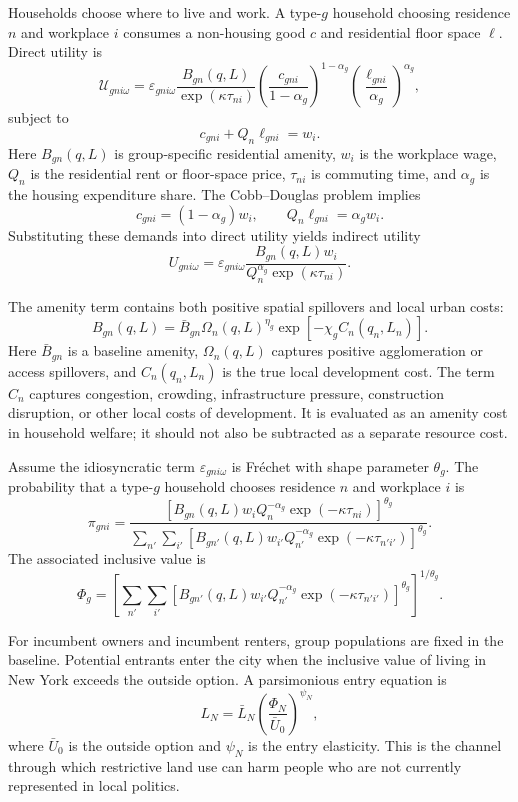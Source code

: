 Households choose where to live and work.
A type-\(g\) household choosing residence \(n\) and workplace \(i\) consumes a non-housing good \(c\) and residential floor space \(\ell\).
Direct utility is
\[
    \mathcal{U}_{gni\omega}
    =
    \varepsilon_{gni\omega}
    \frac{B_{gn}(q,L)}{\exp(\kappa \tau_{ni})}
    \left(\frac{c_{gni}}{1-\alpha_g}\right)^{1-\alpha_g}
    \left(\frac{\ell_{gni}}{\alpha_g}\right)^{\alpha_g},
\]
subject to
\[
    c_{gni}+Q_n\ell_{gni}=w_i.
\]
Here \(B_{gn}(q,L)\) is group-specific residential amenity, \(w_i\) is the workplace wage, \(Q_n\) is the residential rent or floor-space price, \(\tau_{ni}\) is commuting time, and \(\alpha_g\) is the housing expenditure share.
The Cobb--Douglas problem implies
\[
    c_{gni}=(1-\alpha_g)w_i,
    \qquad
    Q_n\ell_{gni}=\alpha_g w_i.
\]
Substituting these demands into direct utility yields indirect utility
\[
    U_{gni\omega}
    =
    \varepsilon_{gni\omega}
    \frac{B_{gn}(q,L)w_i}{Q_n^{\alpha_g}\exp(\kappa\tau_{ni})}.
\]

The amenity term contains both positive spatial spillovers and local urban costs:
\[
    B_{gn}(q,L)
    =
    \bar B_{gn}\Omega_n(q,L)^{\eta_g}
    \exp[-\chi_g C_n(q_n,L_n)].
\]
Here \(\bar B_{gn}\) is a baseline amenity, \(\Omega_n(q,L)\) captures positive agglomeration or access spillovers, and \(C_n(q_n,L_n)\) is the true local development cost.
The term \(C_n\) captures congestion, crowding, infrastructure pressure, construction disruption, or other local costs of development.
It is evaluated as an amenity cost in household welfare; it should not also be subtracted as a separate resource cost.

Assume the idiosyncratic term \(\varepsilon_{gni\omega}\) is Fr\'echet with shape parameter \(\theta_g\).
The probability that a type-\(g\) household chooses residence \(n\) and workplace \(i\) is
\[
    \pi_{gni}
    =
    \frac{
    \left[
    B_{gn}(q,L)w_i Q_n^{-\alpha_g}\exp(-\kappa\tau_{ni})
    \right]^{\theta_g}
    }{
    \sum_{n'}\sum_{i'}
    \left[
    B_{gn'}(q,L)w_{i'}Q_{n'}^{-\alpha_g}\exp(-\kappa\tau_{n'i'})
    \right]^{\theta_g}
    }.
\]
The associated inclusive value is
\[
    \Phi_g
    =
    \left[
    \sum_{n'}\sum_{i'}
    \left[
    B_{gn'}(q,L)w_{i'}Q_{n'}^{-\alpha_g}\exp(-\kappa\tau_{n'i'})
    \right]^{\theta_g}
    \right]^{1/\theta_g}.
\]

For incumbent owners and incumbent renters, group populations are fixed in the baseline.
Potential entrants enter the city when the inclusive value of living in New York exceeds the outside option.
A parsimonious entry equation is
\[
    L_N
    =
    \bar L_N
    \left(\frac{\Phi_N}{\bar U_0}\right)^{\psi_N},
\]
where \(\bar U_0\) is the outside option and \(\psi_N\) is the entry elasticity.
This is the channel through which restrictive land use can harm people who are not currently represented in local politics.

